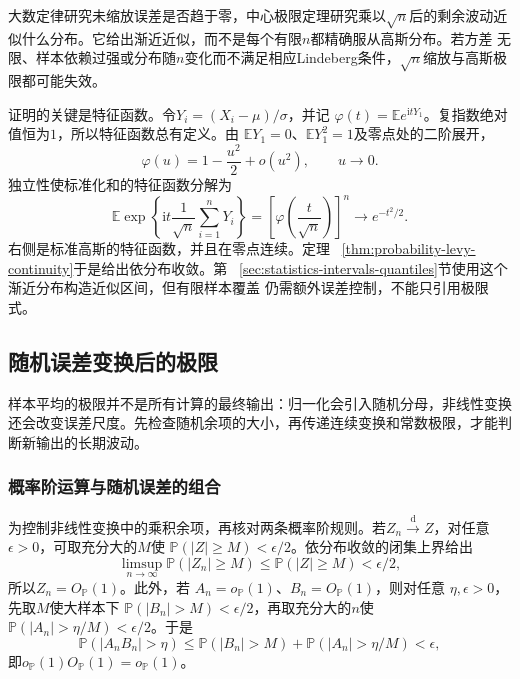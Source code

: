 大数定律研究未缩放误差是否趋于零，中心极限定理研究乘以\(\sqrt{n}\)后的剩余波动近似什么分布。它给出渐近近似，而不是每个有限\(n\)都精确服从高斯分布。若方差
无限、样本依赖过强或分布随\(n\)变化而不满足相应Lindeberg条件，\(\sqrt{n}\)缩放与高斯极限都可能失效。

证明的关键是特征函数。令\(Y_i=(X_i-\mu)/\sigma\)，并记
\(\varphi(t)=\mathbb{E}e^{\mathrm{i}tY_1}\)。复指数绝对值恒为\(1\)，所以特征函数总有定义。由
\(\mathbb{E}Y_1=0\)、\(\mathbb{E}Y_1^2=1\)及零点处的二阶展开，
\[
  \varphi(u)=1-\frac{u^2}{2}+o(u^2),
  \qquad u\to0.
\]
独立性使标准化和的特征函数分解为
\[
  \mathbb{E}\exp\left\{
    \mathrm{i}t\frac{1}{\sqrt n}\sum_{i=1}^{n}Y_i
  \right\}
  =
  \left[\varphi\left(\frac{t}{\sqrt n}\right)\right]^n
  \longrightarrow e^{-t^2/2}.
\]
右侧是标准高斯的特征函数，并且在零点连续。定理
~\ref{thm:probability-levy-continuity}于是给出依分布收敛。第
~\ref{sec:statistics-intervals-quantiles}节使用这个渐近分布构造近似区间，但有限样本覆盖
仍需额外误差控制，不能只引用极限式。
\subsection{随机误差变换后的极限}
\label{sec:stoch-random-transform-limits}
样本平均的极限并不是所有计算的最终输出：归一化会引入随机分母，非线性变换还会改变误差尺度。先检查随机余项的大小，再传递连续变换和常数极限，才能判断新输出的长期波动。

\subsubsection{概率阶运算与随机误差的组合}
为控制非线性变换中的乘积余项，再核对两条概率阶规则。若\(Z_n\xrightarrow{\mathrm d}Z\)，对任意
\(\epsilon>0\)，可取充分大的\(M\)使
\(\mathbb{P}(|Z|\geq M)<\epsilon/2\)。依分布收敛的闭集上界给出
\[
  \limsup_{n\to\infty}\mathbb{P}(|Z_n|\geq M)
  \leq \mathbb{P}(|Z|\geq M)<\epsilon/2,
\]
所以\(Z_n=O_{\mathbb{P}}(1)\)。此外，若
\(A_n=o_{\mathbb{P}}(1)\)、\(B_n=O_{\mathbb{P}}(1)\)，则对任意
\(\eta,\epsilon>0\)，先取\(M\)使大样本下
\(\mathbb{P}(|B_n|>M)<\epsilon/2\)，再取充分大的\(n\)使
\(\mathbb{P}(|A_n|>\eta/M)<\epsilon/2\)。于是
\[
  \mathbb{P}(|A_nB_n|>\eta)
  \leq
  \mathbb{P}(|B_n|>M)
  +\mathbb{P}(|A_n|>\eta/M)
  <\epsilon,
\]
即\(o_{\mathbb{P}}(1)O_{\mathbb{P}}(1)=o_{\mathbb{P}}(1)\)。


